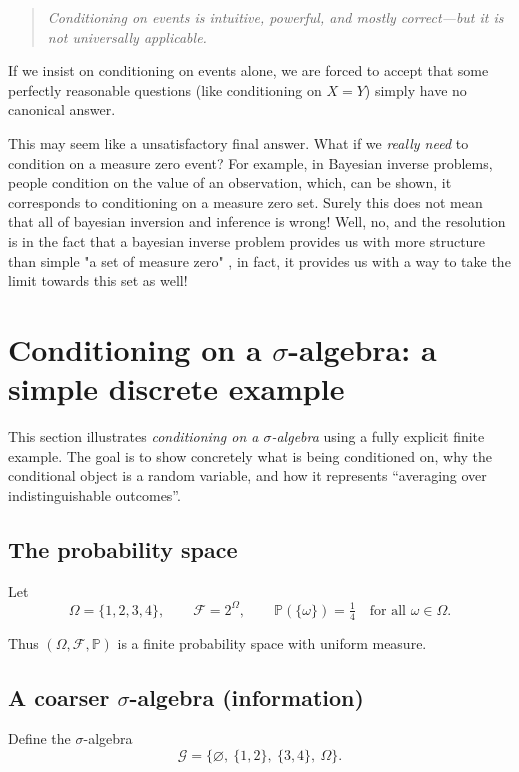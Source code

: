 \documentclass[11pt]{article}
\theoremstyle{remark}
\begin{document}
\begin{quote}
\emph{Conditioning on events is intuitive, powerful, and mostly correct—but it
is not universally applicable.}
\end{quote}

If we insist on conditioning on events alone,
we are forced to accept that some perfectly reasonable questions
(like conditioning on \(X=Y\)) simply have no canonical answer.

This may seem like a unsatisfactory final answer. What if we \emph{really need} to condition on a measure zero event? For example, in Bayesian inverse problems, people condition on the value of an observation, which, can be shown, it corresponds to conditioning on a measure zero set. Surely this does not mean that all of bayesian inversion and inference is wrong! Well, no, and the resolution is in the fact that a bayesian inverse problem provides us with more structure than simple "a set of measure zero" , in fact, it provides us with a way to take the limit towards this set as well!


\section{Conditioning on a $\sigma$-algebra: a simple discrete example}

This section illustrates \emph{conditioning on a $\sigma$-algebra} using a fully explicit
finite example. The goal is to show concretely what is being conditioned on, why the
conditional object is a random variable, and how it represents ``averaging over
indistinguishable outcomes''.

\subsection{The probability space}

Let
\[
\Omega = \{1,2,3,4\}, 
\qquad 
\mathcal F = 2^{\Omega},
\qquad
\mathbb P(\{\omega\}) = \tfrac14 \quad \text{for all } \omega\in\Omega.
\]

Thus $(\Omega,\mathcal F,\mathbb P)$ is a finite probability space with uniform measure.

\subsection{A coarser $\sigma$-algebra (information)}

Define the $\sigma$-algebra
\[
\mathcal G 
= \{\varnothing,\ \{1,2\},\ \{3,4\},\ \Omega\}.
\]
\end{document}
